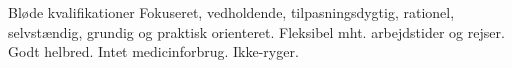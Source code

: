 \begin{rubric}{Bløde kvalifikationer}
\entry* Fokuseret, vedholdende, tilpasningsdygtig, rationel, selvstændig, grundig og praktisk orienteret.
\entry* Fleksibel mht. arbejdstider og rejser.
\entry* Godt helbred. Intet medicinforbrug. Ikke-ryger.
\end{rubric}
